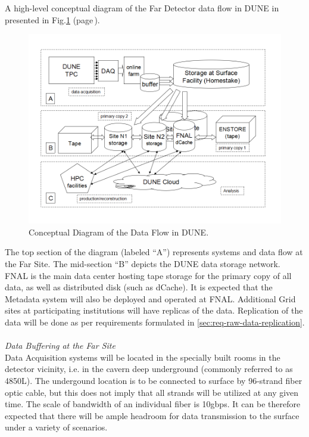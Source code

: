 \noindent
A high-level conceptual diagram of the Far Detector data flow in DUNE in presented in Fig.\ref{fig:DUNEdataflow}
(page\,\pageref{fig:DUNEdataflow}).
\begin{figure}[h!]
\centering
\includegraphics[width=\textwidth]{DUNEdataflow.png}
\caption{Conceptual Diagram of the Data Flow in DUNE.}
\label{fig:DUNEdataflow}
\end{figure}
The top section of the diagram (labeled ``A'') represents systems and data flow at the Far Site.
The mid-section ``B'' depicts the DUNE data storage network. FNAL is the main data center
hosting tape storage for the primary copy of all data, as well as distributed disk (such as dCache).
It is expected that the Metadata system will also be deployed and operated at FNAL.
Additional Grid sites at participating institutions will have replicas of the data.
Replication of the data will be done as per requirements formulated in \ref{sec:req-raw-data-replication}.
\ 
\\

\noindent
\textit{Data Buffering at the Far Site} 
\ 
\\


\noindent
Data Acquisition systems will be located in the specially built rooms in the detector vicinity,
i.e. in the cavern deep underground (commonly referred to as 4850L). The undergound location is to be
connected to surface by 96-strand fiber optic cable, but this does not imply that all strands will be
utilized at any given time. The scale of bandwidth of an individual fiber is 10gbps. It can be therefore
expected that there will be ample headroom for data transmission to the surface under a variety of scenarios.

